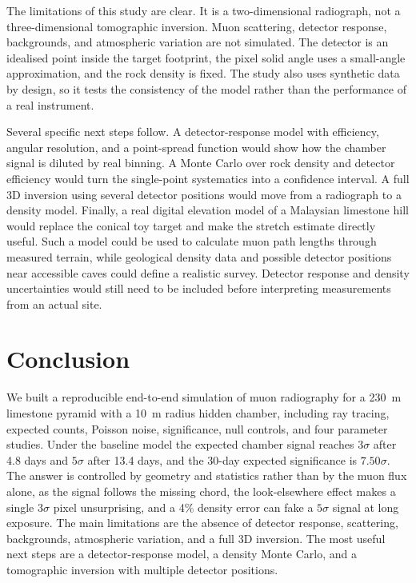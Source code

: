 \documentclass{article}
\begin{document}
The limitations of this study are clear. It is a two-dimensional radiograph,
not a three-dimensional tomographic inversion. Muon scattering, detector
response, backgrounds, and atmospheric variation are not simulated. The
detector is an idealised point inside the target footprint, the pixel solid
angle uses a small-angle approximation, and the rock density is fixed. The
study also uses synthetic data by design, so it tests the consistency of the
model rather than the performance of a real instrument.

Several specific next steps follow. A detector-response model with efficiency,
angular resolution, and a point-spread function would show how the chamber
signal is diluted by real binning. A Monte Carlo over rock density and detector
efficiency would turn the single-point systematics into a confidence interval.
A full 3D inversion using several detector positions would move from a
radiograph to a density model. Finally, a real digital elevation model of a
Malaysian limestone hill would replace the conical toy target and make the
stretch estimate directly useful. Such a model could be used to calculate
muon path lengths through measured terrain, while geological density data and
possible detector positions near accessible caves could define a realistic
survey. Detector response and density uncertainties would still need to be
included before interpreting measurements from an actual site.

\section{Conclusion}

We built a reproducible end-to-end simulation of muon radiography for a
230~m limestone pyramid with a 10~m radius hidden chamber, including ray
tracing, expected counts, Poisson noise, significance, null controls, and four
parameter studies. Under the baseline model the expected chamber signal reaches
$3\sigma$ after 4.8 days and $5\sigma$ after 13.4 days, and the 30-day expected
significance is $7.50\sigma$. The answer is controlled by geometry and
statistics rather than by the muon flux alone, as the signal follows the missing
chord, the look-elsewhere effect makes a single $3\sigma$ pixel unsurprising,
and a 4\% density error can fake a $5\sigma$ signal at long exposure. The main
limitations are the absence of detector response, scattering, backgrounds,
atmospheric variation, and a full 3D inversion. The most useful next steps are
a detector-response model, a density Monte Carlo, and a tomographic inversion
with multiple detector positions.
\end{document}
